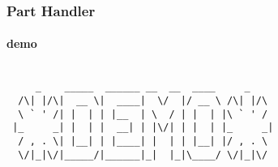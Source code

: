 
\begin{frame}[fragile]
  \frametitle{Part Handler}
  \framesubtitle{demo}

  \begin{Sbox}
  \begin{minipage}{\linewidth-2\fboxsep-2\fboxrule-4pt}
  \color{white}
  \begin{verbatim}

     _    _____  ______ __  __  ____     _    
  /\| |/\|  __ \|  ____|  \/  |/ __ \ /\| |/\ 
  \ ` ' /| |  | | |__  | \  / | |  | |\ ` ' / 
 |_     _| |  | |  __| | |\/| | |  | |_     _|
  / , . \| |__| | |____| |  | | |__| |/ , . \ 
  \/|_|\/|_____/|______|_|  |_|\____/ \/|_|\/ 
  \end{verbatim}
  \end{minipage}
  \end{Sbox}

\end{frame}
